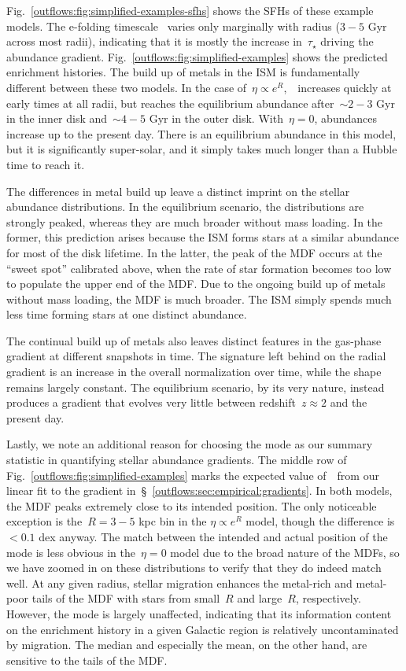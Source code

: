 Fig.~\ref{outflows:fig:simplified-examples-sfhs} shows the SFHs of these
example models.
The e-folding timescale~ varies only marginally with radius
($3 - 5$ Gyr across most radii), indicating that it is mostly the increase
in~$\tau_\star$ driving the abundance gradient.
Fig.~\ref{outflows:fig:simplified-examples} shows the predicted enrichment
histories.
The build up of metals in the ISM is fundamentally different between these two
models.
In the case of~$\eta \propto e^R$,~\oh~increases quickly at early times at all
radii, but reaches the equilibrium abundance after~$\sim$$2 - 3$ Gyr in the
inner disk and~$\sim$$4 - 5$ Gyr in the outer disk.
With~$\eta = 0$, abundances increase up to the present day.
There is an equilibrium abundance in this model, but it is significantly
super-solar, and it simply takes much longer than a Hubble time to reach it.
\par
The differences in metal build up leave a distinct imprint on the stellar
abundance distributions.
In the equilibrium scenario, the distributions are strongly peaked, whereas
they are much broader without mass loading.
In the former, this prediction arises because the ISM forms stars at a similar
abundance for most of the disk lifetime.
In the latter, the peak of the MDF occurs at the ``sweet spot'' calibrated
above, when the rate of star formation becomes too low to populate the upper
end of the MDF.
Due to the ongoing build up of metals without mass loading, the MDF is much
broader.
The ISM simply spends much less time forming stars at one distinct abundance.
\par
The continual build up of metals also leaves distinct features in the gas-phase
gradient at different snapshots in time.
The signature left behind on the radial gradient is an increase in the overall
normalization over time, while the shape remains largely constant.
The equilibrium scenario, by its very nature, instead produces a gradient that
evolves very little between redshift~$z \approx 2$ and the present day.
\par
Lastly, we note an additional reason for choosing the mode as our summary
statistic in quantifying stellar abundance gradients.
The middle row of Fig.~\ref{outflows:fig:simplified-examples} marks the
expected value of~\oh~from our linear fit to the gradient
in~\S~\ref{outflows:sec:empirical:gradients}.
In both models, the MDF peaks extremely close to its intended position.
The only noticeable exception is the~$R = 3 - 5$ kpc bin in the
$\eta \propto e^R$ model, though the difference is~$< 0.1$ dex anyway.
The match between the intended and actual position of the mode is less
obvious in the~$\eta = 0$ model due to the broad nature of the MDFs, so we have
zoomed in on these distributions to verify that they do indeed match well.
At any given radius, stellar migration enhances the metal-rich and metal-poor
tails of the MDF with stars from small~$R$ and large~$R$, respectively.
However, the mode is largely unaffected, indicating that its information
content on the enrichment history in a given Galactic region is relatively
uncontaminated by migration.
The median and especially the mean, on the other hand, are sensitive to the
tails of the MDF.

